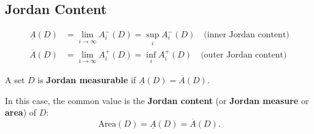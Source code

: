 \documentclass[11pt]{report}
\begin{document}
\subsection*{Jordan Content}

\begin{definition}
\begin{align*}
\underline{A}(D) &= \lim_{i \to \infty} A_i^-(D) = \sup_i A_i^-(D) \quad \text{(inner Jordan content)} \\
\overline{A}(D) &= \lim_{i \to \infty} A_i^+(D) = \inf_i A_i^+(D) \quad \text{(outer Jordan content)}
\end{align*}
\end{definition}

\begin{definition}
A set $D$ is \textbf{Jordan measurable} if $\underline{A}(D) = \overline{A}(D)$.

In this case, the common value is the \textbf{Jordan content} (or \textbf{Jordan measure} or \textbf{area}) of $D$:
\[
\text{Area}(D) = \underline{A}(D) = \overline{A}(D).
\]
\end{definition}
\end{document}
